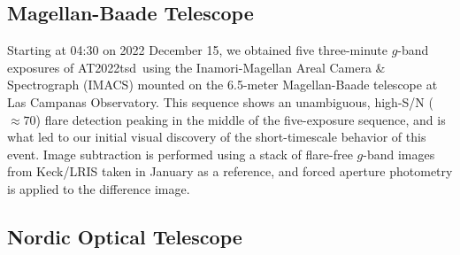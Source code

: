 \documentclass{nature_plusfigure}
\newcommand{\at}{AT2022tsd}
\begin{document}
\begin{methods}

\subsection{Magellan-Baade Telescope}
\label{sec:magellan}

Starting at 04:30 on 2022 December 15, we obtained five three-minute $g$-band exposures of \at\ using the Inamori-Magellan Areal Camera \& Spectrograph (IMACS\cite{Dressler2011}) mounted on the 6.5-meter Magellan-Baade telescope at Las Campanas Observatory.  This sequence shows an unambiguous, high-S/N ($\approx70$) flare detection peaking in the middle of the five-exposure sequence, and is what led to our initial visual discovery of the short-timescale behavior of this event.  Image subtraction is performed using a stack of flare-free $g$-band images from Keck/LRIS taken in January as a reference, and forced aperture photometry is applied to the difference image.

\subsection{Nordic Optical Telescope}
\label{sec:not}


\end{methods}
\end{document}
